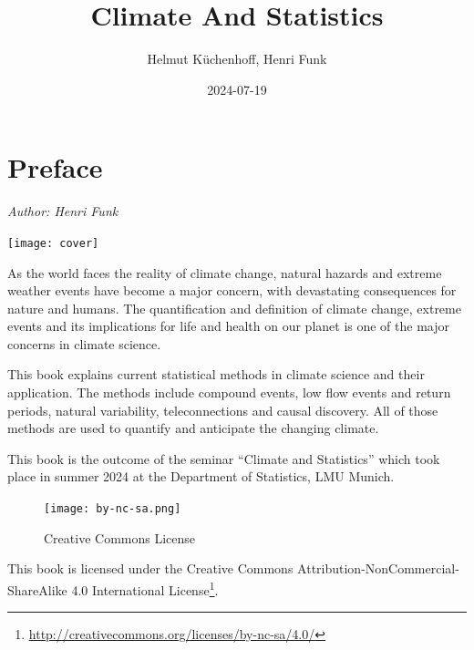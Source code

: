 \documentclass[
]{krantz}
\title{Climate And Statistics}
\author{Helmut Küchenhoff, Henri Funk}
\date{2024-07-19}
\renewcommand{\href}[2]{#2\footnote{\url{#1}}}
\begin{document}
\maketitle


\thispagestyle{empty}

\begin{center}
\end{center}

\setlength{\abovedisplayskip}{-5pt}
\setlength{\abovedisplayshortskip}{-5pt}

{
\hypersetup{linkcolor=}
\setcounter{tocdepth}{0}
\tableofcontents
}
\chapter*{Preface}\label{preface}


\emph{Author: Henri Funk}

\begin{center}\texttt{[image: cover]} \end{center}

As the world faces the reality of climate change, natural hazards and extreme weather events have become a major concern, with devastating consequences for nature and humans. The quantification and definition of climate change, extreme events and its implications for life and health on our planet is one of the major concerns in climate science.

This book explains current statistical methods in climate science and their application.
The methods include compound events, low flow events and return periods, natural variability, teleconnections and causal discovery.
All of those methods are used to quantify and anticipate the changing climate.

This book is the outcome of the seminar ``Climate and Statistics'' which took place in summer 2024 at the Department of Statistics, LMU Munich.

\begin{figure}
\centering
\texttt{[image: by-nc-sa.png]}
\caption{Creative Commons License}
\end{figure}

This book is licensed under the \href{http://creativecommons.org/licenses/by-nc-sa/4.0/}{Creative Commons Attribution-NonCommercial-ShareAlike 4.0 International License}.
\end{document}
